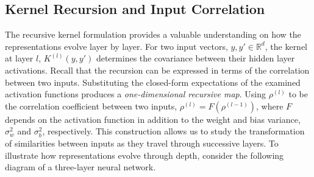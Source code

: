 \documentclass{article}
\newcommand{\R}{\mathbb{R}}
\begin{document}
\subsection{Kernel Recursion and Input Correlation}
The recursive kernel formulation provides a valuable understanding on how the representations evolve layer by layer. For two input vectors, $y,y'\in \R^d$, the kernel at layer $l$, $K^{(l)}(y,y')$ determines the covariance between their hidden layer activations. Recall that the recursion can be expressed in terms of the correlation between two inputs. Substituting the closed-form expectations of the examined activation functions produces a \textit{one-dimensional recursive map}. Using $\rho^{(l)}$ to be the correlation coefficient between two inputs, $\rho^{(l)}=F(\rho^{(l-1)})$, where $F$ depends on the activation function in addition to the weight and bias variance, $\sigma^2_w$ and $\sigma_b^2$, respectively. This construction allows us to study the transformation of similarities between inputs as they travel through successive layers. To illustrate how representations evolve through depth, consider the following diagram of a three-layer neural network.
\begin{center}
\end{center}
\end{document}
